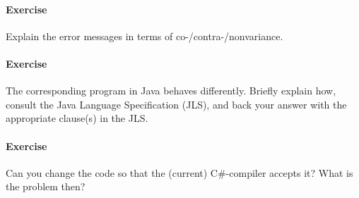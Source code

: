 \documentclass{article}
\newcommand{\percents}[1]{\protect \marginpar[l]{\bf [#1]}}
\newcounter{question}
\newcommand{\question}[1]{
  \addtocounter{question}{1}
  \paragraph{Exercise~\arabic{question}  \percents{#1}}
 }
\newcommand{\removed}[1]{}
\begin{document}
\question{**} Explain the error messages in terms of co-/contra-/nonvariance.

\question{***} The corresponding program in Java behaves differently. Briefly
explain how, consult the Java Language Specification (JLS), and back your answer
with the appropriate clause(s) in the JLS.

\question{-} Can you change the code so that the (current)
C\#-compiler accepts it? What is the problem then?

\removed{
\subsection{Dynamic dispatching \& the visitor}

Suppose the three classes \textsf{Shape}, \textsf{Rectangle}, and
\textsf{Circle}, and the appropriate inheritance relation between them.
Further assume a method \textsf{intersect()} that can determine whether two
shapes overlap. Obviously, the implementation of \textsf{intersect()}
depends on the actual shapes involved.

\question{*} Implement and design the 3 classes so that all possible
intersections of shapes can be properly handled using Smalltalk.  What
is the problem with single dispatching? Name at least 2 issues.


  The following Java snippet redesigns the
  class hierarchy using \textit{double dispatch}.
  Explain how double dispatching works by
  giving the sequence of calls for the line marked (*) in \textsf{Main}.
  Name two problems with double dispatching.

\begin{java}
class Shape {
    public  boolean intersect(Shape s) {
         return s.intersectShape(this);
    }
    protected  boolean intersectShape(Shape s) {
        // intersect Shape x Shape
    }
    protected  boolean intersectRectangle(Rectangle r) {
        // no special code for Shape x Rectangle
        return intersectShape(r);
    }
    protected  boolean intersectCircle(Circle c) {
        return intersectShape(c);
   }
}
class Rectangle extends Shape {
    public  boolean intersect(Shape s) {
        return s.intersectRectangle(this);
    }
    protected  boolean intersectRectangle(Rectangle r) {
        // Rectangle x Rectangle
        ..
    }
}
class Circle extends Shape {
    public  boolean intersect(Shape s) {
        return s.intersectCircle(this);
    }
    protected  boolean intersectCircle(Circle c) {
        // Circle x Circle
   }
}


\end{java}}
\end{document}
